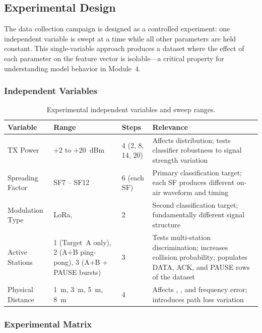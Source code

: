 \documentclass[11pt,letterpaper]{article}
\begin{document}
	\subsection{Experimental Design}

	The data collection campaign is designed as a controlled experiment: one independent variable is swept at a time while all other parameters are held constant. This single-variable approach produces a dataset where the effect of each parameter on the feature vector is isolable---a critical property for understanding \ML{} model behavior in Module~4.

	\subsubsection{Independent Variables}

	\begin{table}[ht!]
		\centering
		\caption{Experimental independent variables and sweep ranges.}
		\label{tab:variables}
		\renewcommand{\arraystretch}{1.3}
		\begin{tabularx}{\textwidth}{l l l X}
			\toprule
			\textbf{Variable} & \textbf{Range} & \textbf{Steps} & \textbf{\ML{} Relevance} \\
			\midrule
			TX Power & +2 to +20~dBm & 4 (2, 8, 14, 20) & Affects \RSSI{} distribution; tests classifier robustness to signal strength variation \\
			Spreading Factor & SF7 -- SF12 & 6 (each SF) & Primary classification target; each SF produces different on-air waveform and timing \\
			Modulation Type & LoRa, \FSK{} & 2 & Second classification target; fundamentally different signal structure \\
			Active Stations & 1 (Target~A only), 2 (A+B ping-pong), 3 (A+B + PAUSE bursts) & 3 & Tests multi-station discrimination; increases collision probability; populates DATA, ACK, and PAUSE rows of the dataset \\
			Physical Distance & 1~m, 3~m, 5~m, 8~m & 4 & Affects \RSSI{}, \SNR{}, and frequency error; introduces path loss variation \\
			\bottomrule
		\end{tabularx}
	\end{table}

	\subsubsection{Experimental Matrix}
\end{document}
